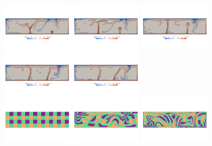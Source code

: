 \begin{center}
\includegraphics[width=3.5cm]{python_codes/fieldstone_88/results/model1/T0015.png}
\includegraphics[width=3.5cm]{python_codes/fieldstone_88/results/model1/T0016.png}
\includegraphics[width=3.5cm]{python_codes/fieldstone_88/results/model1/T0017.png}
\includegraphics[width=3.5cm]{python_codes/fieldstone_88/results/model1/T0018.png}
\includegraphics[width=3.5cm]{python_codes/fieldstone_88/results/model1/T0019.png}\\
\includegraphics[width=3.5cm]{python_codes/fieldstone_88/results/model1/m0000.png}
\includegraphics[width=3.5cm]{python_codes/fieldstone_88/results/model1/m0004.png}
\includegraphics[width=3.5cm]{python_codes/fieldstone_88/results/model1/m0009.png}

\end{center}
